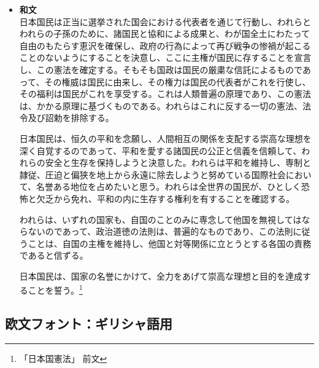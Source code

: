 \documentclass[a4paper,10pt]{ltjsarticle}
\begin{document}
\begin{itemize} 
  \item[]
\textbf{和文}\\
\hspace{3mm} 日本国民は正当に選挙された国会における代表者を通じて行動し、われらとわれらの子孫のために、諸国民と協和による成果と、わが国全土にわたって自由のもたらす恵沢を確保し、政府の行為によって再び戦争の惨禍が起こることのないようにすることを決意し、ここに主権が国民に存することを宣言し、この憲法を確定する。そもそも国政は国民の厳粛な信託によるものであって、その権威は国民に由来し、その権力は国民の代表者がこれを行使し、その福利は国民がこれを享受する。これは人類普遍の原理であり、この憲法は、かかる原理に基づくものである。われらはこれに反する一切の憲法、法令及び詔勅を排除する。\par

\hspace{3mm} 日本国民は、恒久の平和を念願し、人間相互の関係を支配する崇高な理想を深く自覚するのであって、平和を愛する諸国民の公正と信義を信頼して、われらの安全と生存を保持しようと決意した。われらは平和を維持し、専制と隷従、圧迫と偏狭を地上から永遠に除去しようと努めている国際社会において、名誉ある地位を占めたいと思う。われらは全世界の国民が、ひとしく恐怖と欠乏から免れ、平和の内に生存する権利を有することを確認する。\par

\hspace{3mm} われらは、いずれの国家も、自国のことのみに専念して他国を無視してはならないのであって、政治道徳の法則は、普遍的なものであり、この法則に従うことは、自国の主権を維持し、他国と対等関係に立とうとする各国の責務であると信ずる。\par

日本国民は、国家の名誉にかけて、全力をあげて崇高な理想と目的を達成することを誓う。\footnote{「日本国憲法」 前文}\par\vspace{-4mm}
\end{itemize}

\subsection{欧文フォント：ギリシャ語用}
\vspace{-2mm}
\end{document}

